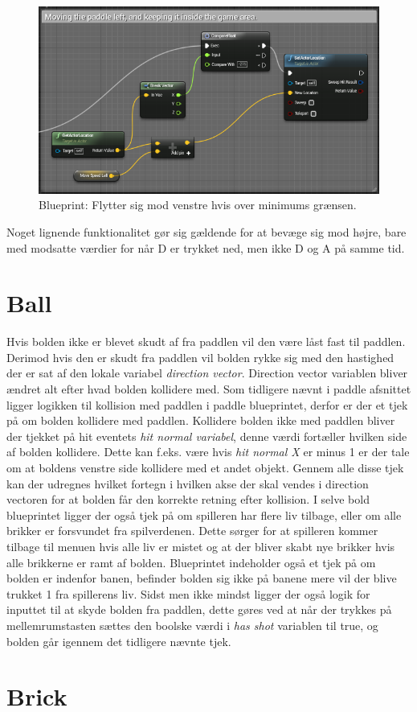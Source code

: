 \begin{figure}
	\begin{center}
		\caption{Blueprint: Flytter sig mod venstre hvis over minimums grænsen.}
		\label{dia:paddlemoveleft}
		\includegraphics[width=0.98\linewidth]{pictures/blueprints/paddle-move-left}
		\end{center}
\end{figure}

Noget lignende funktionalitet gør sig gældende for at bevæge sig mod højre, bare med modsatte værdier for når D er trykket ned, men ikke D og A på samme tid.

\section{Ball}
Hvis bolden ikke er blevet skudt af fra paddlen vil den være låst fast til paddlen. Derimod hvis den er skudt fra paddlen vil bolden rykke sig med den hastighed der er sat af den lokale variabel \textit{direction vector}. Direction vector variablen bliver ændret alt efter hvad bolden kollidere med. Som tidligere nævnt i paddle afsnittet ligger logikken til kollision med paddlen i paddle blueprintet, derfor er der et tjek på om bolden kollidere med paddlen. Kollidere bolden ikke med paddlen bliver der tjekket på hit eventets \textit{hit normal variabel}, denne værdi fortæller hvilken side af bolden kollidere. Dette kan f.eks. være hvis \textit{hit normal X} er minus 1 er der tale om at boldens venstre side kollidere med et andet objekt. Gennem alle disse tjek kan der udregnes hvilket fortegn i hvilken akse der skal vendes i direction vectoren for at bolden får den korrekte retning efter kollision. I selve bold blueprintet ligger der også tjek på om spilleren har flere liv tilbage, eller om alle brikker er forsvundet fra spilverdenen. Dette sørger for at spilleren kommer tilbage til menuen hvis alle liv er mistet og at der bliver skabt nye brikker hvis alle brikkerne er ramt af bolden. Blueprintet indeholder også et tjek på om bolden er indenfor banen, befinder bolden sig ikke på banene mere vil der blive trukket 1 fra spillerens liv. Sidst men ikke mindst ligger der også logik for inputtet til at skyde bolden fra paddlen, dette gøres ved at når der trykkes på mellemrumstasten sættes den boolske værdi i \textit{has shot} variablen til true, og bolden går igennem det tidligere nævnte tjek.  

\section{Brick}

